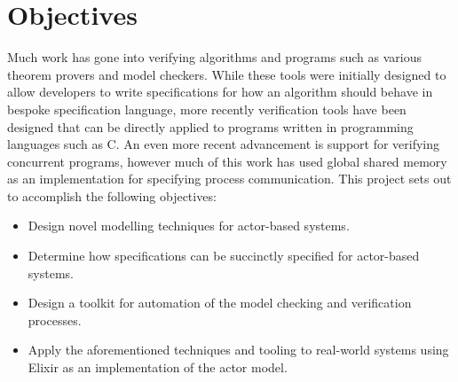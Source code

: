 \section{Objectives}
Much work has gone into verifying algorithms and programs such as various theorem provers and model checkers. While these tools were initially designed to allow developers to write specifications for how an algorithm should behave in bespoke specification language, more recently verification tools have been designed that can be directly applied to programs written in programming languages such as C. An even more recent advancement is support for verifying concurrent programs, however much of this work has used global shared memory as an implementation for specifying process communication. This project sets out to accomplish the following objectives:
\begin{itemize}
    \item Design novel modelling techniques for actor-based systems.
    \item Determine how specifications can be succinctly specified for actor-based systems.
    \item Design a toolkit for automation of the model checking and verification processes.
    \item Apply the aforementioned techniques and tooling to real-world systems using Elixir as an implementation of the actor model.
\end{itemize}
